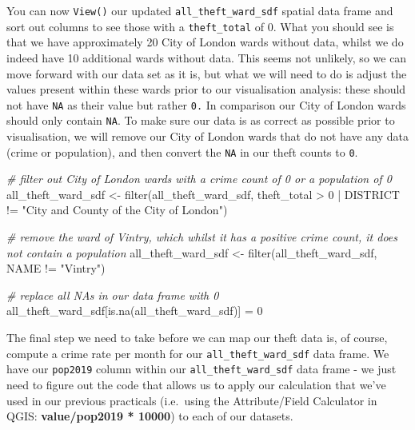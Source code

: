 \documentclass[
]{book}
\newenvironment{Shaded}{\begin{snugshade}}{\end{snugshade}}
\newcommand{\CommentTok}[1]{\textcolor[rgb]{0.56,0.35,0.01}{\textit{#1}}}
\newcommand{\DecValTok}[1]{\textcolor[rgb]{0.00,0.00,0.81}{#1}}
\newcommand{\FunctionTok}[1]{\textcolor[rgb]{0.00,0.00,0.00}{#1}}
\newcommand{\NormalTok}[1]{#1}
\newcommand{\OtherTok}[1]{\textcolor[rgb]{0.56,0.35,0.01}{#1}}
\newcommand{\SpecialCharTok}[1]{\textcolor[rgb]{0.00,0.00,0.00}{#1}}
\newcommand{\StringTok}[1]{\textcolor[rgb]{0.31,0.60,0.02}{#1}}
\begin{document}
You can now \texttt{View()} our updated \texttt{all\_theft\_ward\_sdf} spatial data frame and sort out columns to see those with a \texttt{theft\_total} of 0. What you should see is that we have approximately 20 City of London wards without data, whilst we do indeed have 10 additional wards without data. This seems not unlikely, so we can move forward with our data set as it is, but what we will need to do is adjust the values present within these wards prior to our visualisation analysis: these should not have \texttt{NA} as their value but rather \texttt{0.} In comparison our City of London wards should only contain \texttt{NA}. To make sure our data is as correct as possible prior to visualisation, we will remove our City of London wards that do not have any data (crime or population), and then convert the \texttt{NA} in our theft counts to \texttt{0}.

\begin{Shaded}
\begin{Highlighting}[]
\CommentTok{\# filter out City of London wards with a crime count of 0 or a population of 0}
\NormalTok{all\_theft\_ward\_sdf }\OtherTok{\textless{}{-}} \FunctionTok{filter}\NormalTok{(all\_theft\_ward\_sdf, theft\_total }\SpecialCharTok{\textgreater{}} \DecValTok{0} \SpecialCharTok{|}\NormalTok{ DISTRICT }\SpecialCharTok{!=} \StringTok{"City and County of the City of London"}\NormalTok{) }

\CommentTok{\# remove the ward of Vintry, which whilst it has a positive crime count, it does not contain a population}
\NormalTok{all\_theft\_ward\_sdf }\OtherTok{\textless{}{-}} \FunctionTok{filter}\NormalTok{(all\_theft\_ward\_sdf, NAME }\SpecialCharTok{!=} \StringTok{"Vintry"}\NormalTok{)}

\CommentTok{\# replace all NAs in our data frame with 0}
\NormalTok{all\_theft\_ward\_sdf[}\FunctionTok{is.na}\NormalTok{(all\_theft\_ward\_sdf)] }\OtherTok{=} \DecValTok{0}
\end{Highlighting}
\end{Shaded}

The final step we need to take before we can map our theft data is, of course, compute a crime rate per month for our \texttt{all\_theft\_ward\_sdf} data frame. We have our \texttt{pop2019} column within our \texttt{all\_theft\_ward\_sdf} data frame - we just need to figure out the code that allows us to apply our calculation that we've used in our previous practicals (i.e.~using the Attribute/Field Calculator in QGIS: \textbf{value/pop2019 * 10000}) to each of our datasets.
\end{document}
